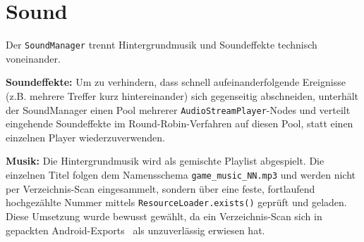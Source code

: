 \documentclass[oneside]{ausarbeitung}
\begin{document}
\section{Sound}

Der \texttt{SoundManager} trennt Hintergrundmusik und Soundeffekte technisch voneinander.

\textbf{Soundeffekte:} Um zu verhindern, dass schnell aufeinanderfolgende Ereignisse (z.B. mehrere
Treffer kurz hintereinander) sich gegenseitig abschneiden, unterhält der SoundManager einen Pool
mehrerer \texttt{AudioStreamPlayer}-Nodes und verteilt eingehende Soundeffekte im Round-Robin-Verfahren
auf diesen Pool, statt einen einzelnen Player wiederzuverwenden.

\textbf{Musik:} Die Hintergrundmusik wird als gemischte Playlist abgespielt. Die einzelnen Titel
folgen dem Namensschema \texttt{game\_music\_NN.mp3} und werden nicht per Verzeichnis-Scan
eingesammelt, sondern über eine feste, fortlaufend hochgezählte Nummer mittels
\texttt{ResourceLoader.exists()} geprüft und geladen. Diese Umsetzung wurde bewusst gewählt, da ein
Verzeichnis-Scan sich in gepackten Android-Exports~\cite{godot:androidexport} als unzuverlässig erwiesen hat.




\end{document}
